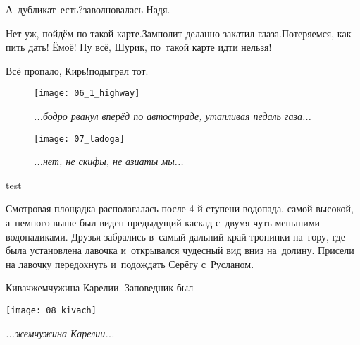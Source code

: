 \diagdash А~дубликат~есть?\mdash заволновалась Надя.

\diagdash Нет уж, пойдём по такой карте.\mdash Замполит деланно закатил глаза.\mdash Потеряемся, как пить дать! Ё\sdash моё! Ну всё, Шурик, по~такой карте идти нельзя! 

\diagdash Всё пропало, Кирь!\mdash подыграл тот.





\vspace{20mm}

\begin{figure}[h]
	\centering
	\texttt{[image: 06\_1\_highway]}
	\caption{\small\textit{...бодро рванул вперёд по автостраде, утапливая педаль газа...}}
\end{figure}

\newpage

\begin{figure}[h]
	\centering
	\texttt{[image: 07\_ladoga]}
	\caption{\small\textit{...нет, не скифы, не азиаты мы...}}
\end{figure}

\newpage

test

\noindent
\begin{minipage}{0.45\textwidth}
	\setlength{\parindent}{1.0cm}  %
	
	\indent Смотровая площадка располагалась после 4-й ступени водопада, самой высокой, а~немного выше был виден предыдущий каскад с~двумя чуть меньшими водопадиками. Друзья забрались в~самый дальний край тропинки на~гору, где была установлена лавочка и~открывался чудесный вид вниз на~долину. Присели на лавочку передохнуть и~подождать Серёгу с~Русланом.
	
	\indent Кивач\mdash жемчужина Карелии. Заповедник был 
\end{minipage}\hfill
\begin{minipage}{0.5\textwidth}
	\centering
	\texttt{[image: 08\_kivach]}
	
	{\small\textit{...жемчужина Карелии...}}
\end{minipage}

